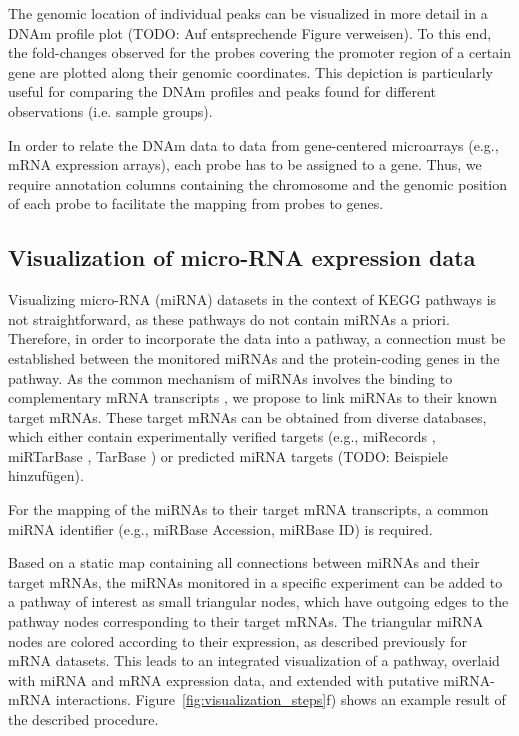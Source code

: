 \documentclass{bioinfo}
\begin{document}
The genomic location of individual peaks can be visualized in more detail in a DNAm profile plot
(TODO: Auf entsprechende Figure verweisen).  To this end, the fold-changes observed for the probes
covering the promoter region of a certain gene are plotted along their genomic coordinates. This
depiction is particularly useful for comparing the DNAm profiles and peaks found for different
observations (i.e. sample groups).

In order to relate the DNAm data to data from gene-centered microarrays (e.g., mRNA expression
arrays), each probe has to be assigned to a gene. Thus, we require annotation columns containing the
chromosome and the genomic position of each probe to facilitate the mapping from probes to genes.

\subsection{Visualization of micro-RNA expression data}

Visualizing micro-RNA (miRNA) datasets in the context of KEGG pathways is not straightforward, as
these pathways do not contain miRNAs a priori. Therefore, in order to incorporate the data into a
pathway, a connection must be established between the monitored miRNAs and the protein-coding genes
in the pathway. As the common mechanism of miRNAs involves the binding to complementary mRNA
transcripts \citep{Bartel2004}, we propose to link miRNAs to their known target mRNAs.  These target
mRNAs can be obtained from diverse databases, which either contain experimentally verified targets
(e.g., miRecords \citep[see][]{miRecords}, miRTarBase \citep[see][]{miRTarBase}, TarBase
\citep[see][]{TarBase}) or predicted miRNA targets \citep{Alexiou2009} (TODO: Beispiele hinzufügen).

For the mapping of the miRNAs to their target mRNA transcripts, a common miRNA identifier (e.g.,
miRBase Accession, miRBase ID) is required.

Based on a static map containing all connections between miRNAs and their target mRNAs, the miRNAs
monitored in a specific experiment can be added to a pathway of interest as small triangular nodes,
which have outgoing edges to the pathway nodes corresponding to their target mRNAs.  The triangular
miRNA nodes are colored according to their expression, as described previously for mRNA datasets.
This leads to an integrated visualization of a pathway, overlaid with miRNA and mRNA expression
data, and extended with putative miRNA-mRNA interactions. Figure~\ref{fig:visualization_steps}f)
shows an example result of the described procedure.
\end{document}
